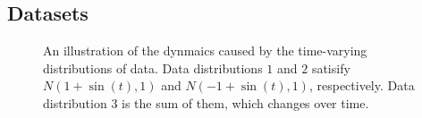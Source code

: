 \documentclass{article}
\begin{document}
\subsection{Datasets}

\begin{figure}[!]
\setlength{\abovecaptionskip}{0pt}
\setlength{\belowcaptionskip}{0pt}
\centering 
{}
\caption{An illustration of the dynmaics caused by the time-varying distributions of data. Data distributions $1$ and $2$ satisify $N(1+\sin(t), 1)$ and $N(-1+\sin(t), 1)$, respectively. Data distribution $3$ is the sum of them, which changes over time. }
\label{figure_illus_dynamics}
\end{figure}
\end{document}
